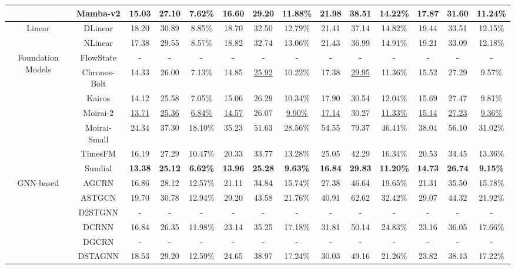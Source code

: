 \begin{table}[t]
{\begin{tabular}{c|c|c|c|c|c|c|c|c|c|c|c|c|c}
 & Mamba-v2 & 15.03 & 27.10 & 7.62\% & 16.60 & 29.20 & 11.88\% & 21.98 & 38.51 & 14.22\% & 17.87 & 31.60 & 11.24\% \\
\midrule
\multirow{2}{*}{Linear} & DLinear & 18.20 & 30.89 & 8.85\% & 18.70 & 32.50 & 12.79\% & 21.41 & 37.14 & 14.82\% & 19.44 & 33.51 & 12.15\% \\
 & NLinear & 17.38 & 29.55 & 8.57\% & 18.82 & 32.74 & 13.06\% & 21.43 & 36.99 & 14.91\% & 19.21 & 33.09 & 12.18\% \\
\midrule
\multirow{7}{*}{Foundation Models} & FlowState & - & - & - & - & - & - & - & - & - & - & - & - \\
 & Chronos-Bolt & 14.33 & 26.00 & 7.13\% & 14.85 & \underline{25.92} & 10.22\% & 17.38 & \underline{29.95} & 11.36\% & 15.52 & 27.29 & 9.57\% \\
 & Kairos & 14.12 & 25.58 & 7.05\% & 15.06 & 26.29 & 10.34\% & 17.90 & 30.54 & 12.04\% & 15.69 & 27.47 & 9.81\% \\
 & Moirai-2 & \underline{13.71} & \underline{25.36} & \underline{6.84\%} & \underline{14.57} & 26.07 & \underline{9.90\%} & \underline{17.14} & 30.27 & \underline{11.33\%} & \underline{15.14} & \underline{27.23} & \underline{9.36\%} \\
 & Moirai-Small & 24.34 & 37.30 & 18.10\% & 35.23 & 51.63 & 28.56\% & 54.55 & 79.37 & 46.41\% & 38.04 & 56.10 & 31.02\% \\
 & TimesFM & 16.19 & 27.29 & 10.47\% & 20.33 & 33.77 & 13.28\% & 25.05 & 42.29 & 16.34\% & 20.53 & 34.45 & 13.36\% \\
 & Sundial & \textbf{13.38} & \textbf{25.12} & \textbf{6.62\%} & \textbf{13.96} & \textbf{25.28} & \textbf{9.63\%} & \textbf{16.84} & \textbf{29.83} & \textbf{11.20\%} & \textbf{14.73} & \textbf{26.74} & \textbf{9.15\%} \\
\midrule
\multirow{10}{*}{GNN-based} & AGCRN & 16.86 & 28.12 & 12.57\% & 21.11 & 34.84 & 15.74\% & 27.38 & 46.64 & 19.65\% & 21.31 & 35.50 & 15.78\% \\
 & ASTGCN & 19.70 & 30.78 & 12.94\% & 29.20 & 43.58 & 21.76\% & 40.91 & 62.62 & 32.42\% & 29.07 & 44.32 & 21.92\% \\
 & D2STGNN & - & - & - & - & - & - & - & - & - & - & - & - \\
 & DCRNN & 16.84 & 26.35 & 11.98\% & 23.14 & 35.25 & 17.18\% & 31.81 & 50.14 & 24.83\% & 23.16 & 36.05 & 17.66\% \\
 & DGCRN & - & - & - & - & - & - & - & - & - & - & - & - \\
 & DSTAGNN & 18.53 & 29.20 & 12.59\% & 24.65 & 38.97 & 17.24\% & 30.03 & 49.16 & 21.26\% & 23.82 & 38.13 & 17.22\% \\

\end{tabular}}
\end{table}

